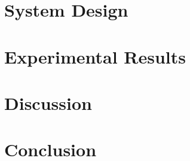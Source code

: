 \documentclass[10pt, a4paper, twoside, twocolumn, technote]{IEEEtran}
\begin{document}
\section{System Design}\label{design}


\section{Experimental Results}\label{experiment}


\section{Discussion}\label{discussion}


\section{Conclusion}\label{conclusion}






\end{document}
